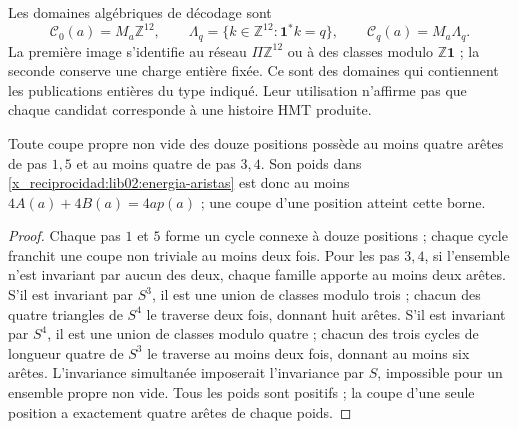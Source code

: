 Les domaines algébriques de décodage sont
\[
 \mathcal C_0(a)=M_a\mathbb Z^{12},\qquad
 \Lambda_q=\{k\in\mathbb Z^{12}:\mathbf1^*k=q\},\qquad
 \mathcal C_q(a)=M_a\Lambda_q.
\]
La première image s’identifie au réseau \(\Pi\mathbb Z^{12}\)
ou à des classes modulo \(\mathbb Z\mathbf1\) ; la seconde conserve une
charge entière fixée. Ce sont des domaines qui contiennent les publications entières
du type indiqué. Leur utilisation n’affirme pas que chaque candidat corresponde à une
histoire HMT produite.

\begin{lemma}
\label{x_reciprocidad:lib02:cortes}
Toute coupe propre non vide des douze positions possède au moins quatre arêtes de pas \(1,5\) et au moins quatre de pas \(3,4\). Son poids dans \eqref{x_reciprocidad:lib02:energia-aristas} est donc au moins \(4A(a)+4B(a)=4ap(a)\) ; une coupe d'une position atteint cette borne.
\end{lemma}
\begin{proof}
Chaque pas \(1\) et \(5\) forme un cycle connexe à douze positions ;
chaque cycle franchit une coupe non triviale au moins deux fois. Pour les pas
\(3,4\), si l’ensemble n’est invariant par aucun des deux, chaque famille
apporte au moins deux arêtes. S’il est invariant par \(S^3\), il est une union
de classes modulo trois ; chacun des quatre triangles de \(S^4\)
le traverse deux fois, donnant huit arêtes. S’il est invariant par \(S^4\),
il est une union de classes modulo quatre ; chacun des trois cycles de longueur
quatre de \(S^3\) le traverse au moins deux fois, donnant au moins six arêtes.
L’invariance simultanée imposerait l’invariance par \(S\), impossible
pour un ensemble propre non vide. Tous les poids sont positifs ; la
coupe d’une seule position a exactement quatre arêtes de chaque
poids.
\end{proof}

